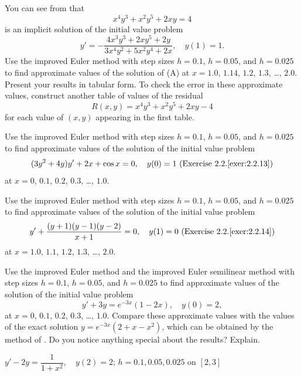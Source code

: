 \begin{exerciselist}
\item\label{exer:3.2.10}\Cex
You can see from  that
\[
x^4y^3+x^2y^5+2xy=4
\]
is an implicit solution of  the initial value problem
\[
y'=-\frac{4x^3y^3+2xy^5+2y}{3x^4y^2+5x^2y^4+2x},\quad y(1)=1.\tag{A}
\]
Use the improved Euler method with step sizes $h=0.1$, $h=0.05$, and
$h=0.025$ to find approximate values of the solution of (A) at
$x=1.0$, $1.14$, $1.2$, $1.3$, \dots, $2.0$. Present your results in
tabular form. To
check the error in these approximate values, construct another table
of values of the residual
\[
R(x,y)=x^4y^3+x^2y^5+2xy-4
\]
for each value of $(x,y)$ appearing in the first table.


\item\label{exer:3.2.11}\Cex
Use the improved Euler method with step sizes $h=0.1$, $h=0.05$, and
$h=0.025$ to find approximate values of the solution of the initial
value problem
\[
(3y^2+4y)y'+2x+\cos x=0, \quad y(0)=1\text{ (Exercise~2.2.\ref{exer:2.2.13})}
\]
at $x=0$, $0.1$, $0.2$, $0.3$, \dots, $1.0$.

\item\label{exer:3.2.12}\Cex
Use the improved Euler method with step sizes $h=0.1$, $h=0.05$, and
$h=0.025$ to find approximate values of the solution of the initial
value problem
\[
y'+\frac{(y+1)(y-1)(y-2)}{x+1}=0, \quad y(1)=0
\text{  (Exercise~2.2.\ref{exer:2.2.14})}
\]
at $x=1.0$, $1.1$, $1.2$, $1.3$, \dots, $2.0$.

\item\label{exer:3.2.13}\Cex
Use the improved Euler method and the improved Euler semilinear method
with step sizes $h=0.1$, $h=0.05$, and $h=0.025$ to find approximate
values of the solution of the initial value problem
\[
y'+3y=e^{-3x}(1-2x),\quad y(0)=2,
\]
at $x=0$, $0.1$, $0.2$, $0.3$, \dots, $1.0$. Compare these approximate
values with the
values of the exact solution $y=e^{-3x}(2+x-x^2)$, which can be
obtained by the method of . Do you notice
anything special about the results? Explain.


\item\label{exer:3.2.14}\Cex
$y'-2y=\dfrac{1}{1+x^2},\quad y(2)=2$;  \quad
$h=0.1,0.05,0.025$ on $[2,3]$


\end{exerciselist}
